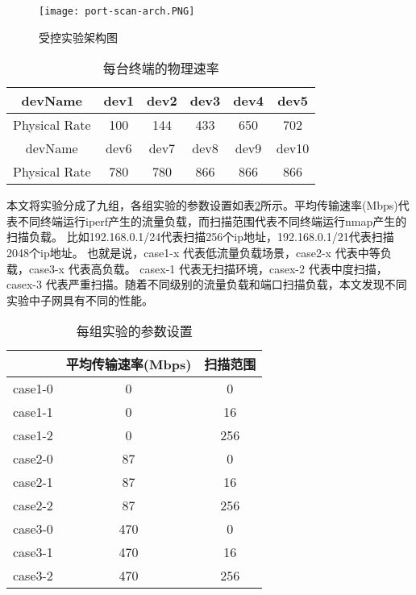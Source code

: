 \begin{figure}
  \centering
  \texttt{[image: port-scan-arch.PNG]}
  \caption{受控实验架构图}
  \label{fig:受控实验架构图}
\end{figure}

\begin{table}[h] 
  \centering  %
  \caption{每台终端的物理速率}  %
  \label{每台终端的物理速率}
  \begin{tabular}{c|ccccc}
  \toprule  %
  devName&dev1&dev2&dev3&dev4&dev5\\
  \hline  %
  Physical Rate&100&144&433&650&702\\
  \bottomrule
  \toprule %
  devName&dev6&dev7&dev8&dev9&dev10\\
  \hline  %
  Physical Rate&780&780&866&866&866\\
  \bottomrule %
  \end{tabular}
  
  \end{table}

  本文将实验分成了九组，各组实验的参数设置如表\ref{每组实验的参数设置}所示。平均传输速率(Mbps)代表不同终端运行iperf产生的流量负载，而扫描范围代表不同终端运行nmap产生的扫描负载。 比如192.168.0.1/24代表扫描256个ip地址，192.168.0.1/21代表扫描2048个ip地址。 也就是说，case1-x 代表低流量负载场景，case2-x 代表中等负载，case3-x 代表高负载。 casex-1 代表无扫描环境，casex-2 代表中度扫描，casex-3 代表严重扫描。随着不同级别的流量负载和端口扫描负载，本文发现不同实验中子网具有不同的性能。 

\begin{table}[htb]
  \centering
  \caption{每组实验的参数设置}
  \label{每组实验的参数设置}
      \begin{tabular}{c|cc}
      \toprule  %
       &平均传输速率(Mbps)&扫描范围\\
      \hline  %
      case1-0& 0 & 0\\
      \hline %
      case1-1& 0 & 16\\
      \hline  %
      case1-2& 0 & 256\\
      \hline %
      case2-0& 87 & 0\\
      \hline %
      case2-1& 87 & 16\\
      \hline  %
      case2-2& 87 & 256\\
      \hline %
      case3-0&470 & 0\\
      \hline %
      case3-1& 470 & 16\\
      \hline  %
      case3-2& 470 & 256\\
      \bottomrule %
      \end{tabular}
\end{table}

